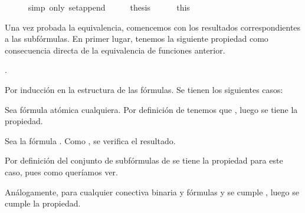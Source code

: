 \begin{isabellebody}
\ \ \ \ \isamarkupfalse%
\ {\isacharparenleft}simp\ only{\isacharcolon}\ set{\isacharunderscore}append{\isacharparenright}\isanewline
\ \ \isamarkupfalse%
\ \isamarkupfalse%
\ {\isacharquery}thesis\isanewline
\ \ \ \ \isamarkupfalse%
\ this\isanewline
{}\isamarkupfalse%
%
\endisatagproof
{\isafoldproof}%
%
\isadelimproof
%
\endisadelimproof
%
\begin{isamarkuptext}%
Una vez probada la equivalencia, comencemos con los resultados 
  correspondientes a las subfórmulas. En primer lugar, tenemos la 
  siguiente propiedad como consecuencia directa de la equivalencia de 
  funciones anterior.


  \begin{lema}
    .
  \end{lema}

  \begin{demostracion}
    Por inducción en la estructura de las fórmulas. Se tienen los
    siguientes casos:
  
    Sea  fórmula atómica cualquiera. Por definición de  tenemos 
    que , luego se tiene la propiedad.
  
    Sea la fórmula \isa{{\isasymbottom}}. Como , se verifica el resultado.

    Por definición del conjunto de subfórmulas de  se tiene 
    la propiedad para este caso, pues 
     como queríamos 
    ver.

    Análogamente, para cualquier conectiva binaria \isa{{\isacharasterisk}} y fórmulas  y 
     se cumple , luego se 
    cumple la propiedad.
  \end{demostracion}


\end{isamarkuptext}
\end{isabellebody}
